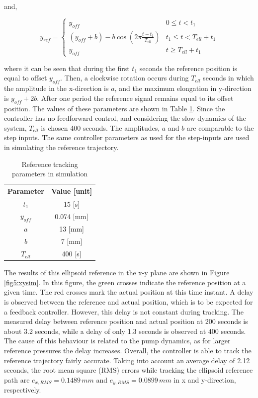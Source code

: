 and,


\begin{equation}
    y_{ref} = \begin{cases} 
       y_{off} &  0 \leq t < t_1 \\
     (y_{off} +b) -  b \cos(2\pi \frac{t - t_1}{T_{ell}}) & t_1 \leq t < T_{ell} + t_1 \\
     y_{off} & t \geq T_{ell} + t_1
   \end{cases}  
   \end{equation}

where it can be seen that during the first $t_1$ seconds the reference position is equal to offset $y_{off}$. Then, a clockwise rotation occurs during $T_{ell}$ seconds in which the amplitude in the x-direction is $a$, and the maximum elongation in y-direction is $y_{off} + 2b$. After one period the reference signal remains equal to its offset position. The values of these parameters are shown in Table \ref{tab5:refparamssim}. Since the controller has no feedforward control, and considering the slow dynamics of the system, $T_{ell}$ is chosen 400 seconds. The amplitudes, $a$ and $b$ are comparable to the step inputs. The same controller parameters as used for the step-inputs are used in simulating the reference trajectory.


\begin{table}[H]
    \centering
    \caption{Reference tracking parameters in simulation}
    \begin{tabular}{|c|c|} \hline
   \textbf{Parameter}  & \textbf{Value [unit]} \\ \hline
    $t_1$ &   15 [s]  \\ 
    $y_{off}$ & 0.074 [mm] \\
    $a$ & 13 [mm] \\
    $b$ & 7 [mm] \\
    $T_{ell}$ & 400 [s] \\ \hline
\end{tabular}
    \label{tab5:refparamssim}
\end{table}


The results of this ellipsoid reference in the x-y plane are shown in Figure \ref{fig5:xysim}. In this figure, the green crosses indicate the reference position at a given time. The red crosses mark the actual position at this time instant. A delay is observed between the reference and actual position, which is to be expected for a feedback controller. However, this delay is not constant during tracking. The measured delay between reference position and actual position at 200 seconds is about 3.2 seconds, while a delay of only 1.3 seconds is observed at 400 seconds. The cause of this behaviour is related to the pump dynamics, as for larger reference pressures the delay increases. Overall, the controller is able to track the reference trajectory fairly accurate. Taking into account an average delay of 2.12 seconds, the root mean square (RMS) errors while tracking the ellipsoid reference path are $e_{x,RMS} = 0.1489 \hspace{2pt} mm$ and $e_{y,RMS} =0.0899 \hspace{2pt} mm$ in x and y-direction, respectively.


